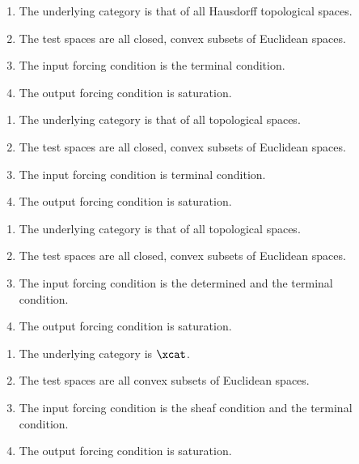 \documentclass[%
a4paper,%
arxiv,%
defaults
]{myclass}
\begin{document}
\begin{description}
\item[\cite{kc}]

\begin{enumerate}
\item The underlying category is that of all Hausdorff topological spaces.
\item The test spaces are all closed, convex subsets of Euclidean spaces.
\item The input forcing condition is the terminal condition.
\item The output forcing condition is saturation.
\end{enumerate}

\item[\cite{kc5}]

\begin{enumerate}
\item The underlying category is that of all topological spaces.
\item The test spaces are all closed, convex subsets of Euclidean spaces.
\item The input forcing condition is terminal condition.
\item The output forcing condition is saturation.
\end{enumerate}

\item[\cite{kc5}]

\begin{enumerate}
\item The underlying category is that of all topological spaces.
\item The test spaces are all closed, convex subsets of Euclidean spaces.
\item The input forcing condition is the determined and the terminal condition.
\item The output forcing condition is saturation.
\end{enumerate}

\item[\cite{kc3}]

\begin{enumerate}
\item The underlying category is \(\xcat\).
\item The test spaces are all convex subsets of Euclidean spaces.
\item The input forcing condition is the sheaf condition and the terminal condition.
\item The output forcing condition is saturation.
\end{enumerate}
\end{description}
\end{document}
